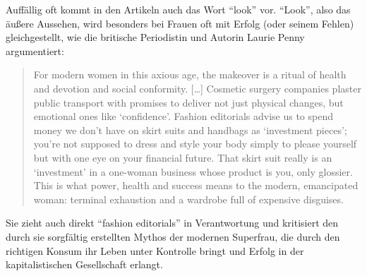 \begin{comment}
Es wurden zum Beispiel bei Vokabeln, die mit Fitness und Gesundheit zu tun haben (``fitness'', ``light'', ``baby carrots'', ``workout'', ``bicycle crunches''), einige Switches ins Englische vorgefunden.
Damit lenken die Herausgeberinnen die Aufmerksamkeit auf die Produkte? selber aber auch auf den generellen Sachverhalt, der in den einzelnen Fällen beschrieben wird.

Außerdem scheint Englisch auch mit einem modernen, hippen und erfolgreichen Lebensstil gleichgesetzt zu werden und oft mit einzelnen Gegenständen oder Dienstleistungen, die dafür erworben werden können.
Hier können Begriffe wie ``coffeehouse'', ``Dirty Martini'', ``trendy'', ``vintage'' oder ``glamour'' verortet werden.
\end{comment}

Auffällig oft kommt in den Artikeln auch das Wort ``look'' vor.
``Look'', also das äußere Aussehen, wird besonders bei Frauen oft mit Erfolg (oder seinem Fehlen) gleichgestellt, wie die britische Periodistin und Autorin Laurie Penny argumentiert:

\begin{quote}
For modern women in this axious age, the makeover is a ritual of health and devotion and social conformity.
[\ldots]
Cosmetic surgery companies plaster public transport with promises to deliver not just physical changes, but emotional ones like `confidence'.
Fashion editorials advise us to spend money we don't have on skirt suits and handbags as `investment pieces'; you're not supposed to dress and style your body simply to please yourself but with one eye on your financial future.
That skirt suit really is an `investment' in a one-woman business whose product is you, only glossier.
This is what power, health and success means to the modern, emancipated woman: terminal exhaustion and a wardrobe full of expensive disguises.~\cite[p.41-42]{Penny14}
\end{quote}

Sie zieht auch direkt ``fashion editorials'' in Verantwortung und kritisiert den durch sie sorgfältig erstellten Mythos der modernen Superfrau, die durch den richtigen Konsum ihr Leben unter Kontrolle bringt und Erfolg in der kapitalistischen Gesellschaft erlangt.

